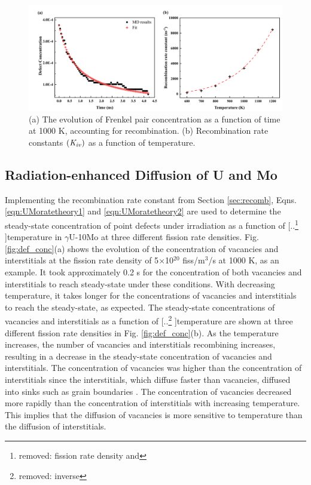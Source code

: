 \documentclass[preprint,12pt]{elsarticle}
\providecommand{\DIFadd}[1]{{\protect\color{blue} \sf #1}} %
\providecommand{\DIFdel}[1]{{\protect\color{red} [..\footnote{removed: #1} ]}} %
\providecommand{\DIFaddbegin}{} %
\providecommand{\DIFaddend}{} %
\providecommand{\DIFdelbegin}{} %
\providecommand{\DIFdelend}{} %
\newcommand{\DIFscaledelfig}{0.5}
\newlength{\DIFdelgraphicswidth} %
\newlength{\DIFdelgraphicsheight} %
\newcommand{\DIFaddincludegraphics}[2][]{{\color{blue}\fbox{\DIFOincludegraphics[#1]{#2}}}} %
\newcommand{\DIFdelincludegraphics}[2][]{%
\sbox{\DIFdelgraphicsbox}{\DIFOincludegraphics[#1]{#2}}%
\settoboxwidth{\DIFdelgraphicswidth}{\DIFdelgraphicsbox} %
\settoboxtotalheight{\DIFdelgraphicsheight}{\DIFdelgraphicsbox} %
\scalebox{\DIFscaledelfig}{%
\parbox[b]{\DIFdelgraphicswidth}{\usebox{\DIFdelgraphicsbox}\\[-\baselineskip] \rule{\DIFdelgraphicswidth}{0em}}\llap{\resizebox{\DIFdelgraphicswidth}{\DIFdelgraphicsheight}{%
\setlength{\unitlength}{\DIFdelgraphicswidth}%
\begin{picture}(1,1)%
\thicklines\linethickness{2pt} %
{\color[rgb]{1,0,0}\put(0,0){\framebox(1,1){}}}%
{\color[rgb]{1,0,0}\put(0,0){\line( 1,1){1}}}%
{\color[rgb]{1,0,0}\put(0,1){\line(1,-1){1}}}%
\end{picture}%
}\hspace*{3pt}}} %
} %
\DeclareRobustCommand{\DIFaddbegin}{\DIFOaddbegin \let\includegraphics\DIFaddincludegraphics} %
\DeclareRobustCommand{\DIFaddend}{\DIFOaddend \let\includegraphics\DIFOincludegraphics} %
\DeclareRobustCommand{\DIFdelbegin}{\DIFOdelbegin \let\includegraphics\DIFdelincludegraphics} %
\DeclareRobustCommand{\DIFdelend}{\DIFOaddend \let\includegraphics\DIFOincludegraphics} %
\begin{document}
\begin{figure}[hbt!]
\centering
\includegraphics[width=1\textwidth]{Fig2.png}
\caption{(a) The evolution of Frenkel pair concentration as a function of time at 1000 K, accounting for recombination. (b) Recombination rate constants $(\it{K}_{iv})$ as a function of temperature.}
\label{fig:recomb}
\end{figure}

\subsection{Radiation-enhanced Diffusion of U and Mo}\label{sec:RED_UMo}
Implementing the recombination rate constant from Section \ref{sec:recomb}, Eqns. \ref{eqn:UMoratetheory1} and \ref{eqn:UMoratetheory2} are used to determine the steady-state concentration of point defects under irradiation as a function of \DIFdelbegin \DIFdel{fission rate density and }\DIFdelend temperature in $\gamma$U-10Mo \DIFaddbegin \DIFadd{at three different fission rate densities}\DIFaddend . Fig. \ref{fig:def_conc}(a) shows the evolution of \DIFaddbegin \DIFadd{the }\DIFaddend concentration of vacancies and interstitials at the fission rate density of 5$\times$10$^{20}$ fiss/m$^{3}$/s at 1000 K, as an example. It took approximately 0.2 s for the concentration of both vacancies and interstitials to reach steady-state under these conditions. \DIFaddbegin \DIFadd{With decreasing temperature, it takes longer for the concentrations of vacancies and interstitials to reach the steady-state, as expected. }\DIFaddend The steady-state concentrations of vacancies and interstitials as a function of \DIFdelbegin \DIFdel{inverse }\DIFdelend temperature are shown at three different fission rate densities in Fig. \ref{fig:def_conc}(b). As the temperature increases, the number of vacancies and interstitials recombining increases, resulting in a decrease in the steady-state concentration of vacancies and interstitials. The concentration of vacancies was higher than the concentration of interstitials since the interstitials, which diffuse faster than vacancies, diffused into sinks such as grain boundaries \cite{park2021atomistic, smirnova2015atomistic}. The concentration of vacancies decreased more rapidly than the concentration of interstitials with increasing temperature. This implies that the diffusion of vacancies is more sensitive to temperature than the diffusion of interstitials.
\end{document}
